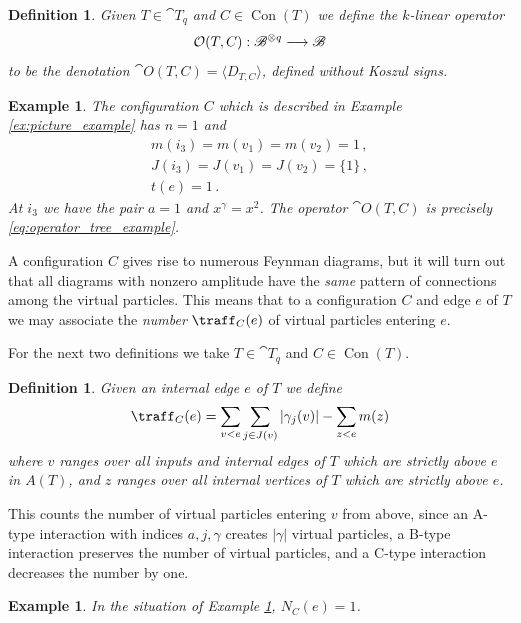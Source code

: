 \documentclass[english,letter paper,12pt,leqno]{article}
\theoremstyle{example}
\newtheorem{definition}[theorem]{Definition}
\newtheorem{example}[theorem]{Example}
\numberwithin{equation}{section}
\begin{document}
\begin{definition}\label{defn:otc} Given $T \in \cat{T}_q$ and $C \in \operatorname{Con}(T)$ we define the $k$-linear operator
\[
\mathcal{O}(T, C): \mathscr{B}^{\otimes q} \longrightarrow \mathscr{B}
\]
to be the denotation $\cat{O}(T,C) = \langle D_{T,C} \rangle$, defined without Koszul signs.
\end{definition}

\begin{example}\label{ex:picture_example_2} The configuration $C$ which is described in Example \ref{ex:picture_example} has $n = 1$ and
\begin{gather*}
m(i_3) = m(v_1) = m(v_2) = 1\,,\\
J(i_3) = J(v_1) = J(v_2) = \{ 1 \}\,,\\
t(e) = 1\,.
\end{gather*}
At $i_3$ we have the pair $a = 1$ and $x^\gamma = x^2$. The operator $\cat{O}(T,C)$ is precisely \eqref{eq:operator_tree_example}.
\end{example}



A configuration $C$ gives rise to numerous Feynman diagrams, but it will turn out that all diagrams with nonzero amplitude have the \emph{same} pattern of connections among the virtual particles. This means that to a configuration $C$ and edge $e$ of $T$ we may associate the \emph{number} $\traff_C(e)$ of virtual particles entering $e$.

For the next two definitions we take $T \in \cat{T}_q$ and $C \in \operatorname{Con}(T)$.

\begin{definition} Given an internal edge $e$ of $T$ we define
\[
\traff_C(e) = \sum_{v < e} \sum_{j \in J(v)} | \gamma_j(v) | - \sum_{z < e} m(z)
\]
where $v$ ranges over all inputs and internal edges of $T$ which are strictly above $e$ in $A(T)$, and $z$ ranges over all internal vertices of $T$ which are strictly above $e$.
\end{definition}

This counts the number of virtual particles entering $v$ from above, since an A-type interaction with indices $a,j,\gamma$ creates $|\gamma|$ virtual particles, a B-type interaction preserves the number of virtual particles, and a C-type interaction decreases the number by one.

\begin{example} In the situation of Example \ref{ex:picture_example_2}, $N_C(e) = 1$.
\end{example}
\end{document}

